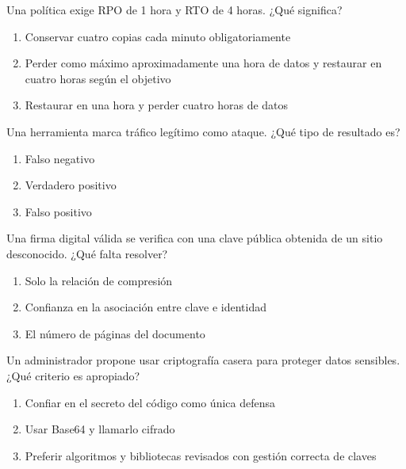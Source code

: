 \noindent\begin{minipage}{\linewidth}\setlength{\parskip}{4pt}\label{q:R-096}
Una política exige RPO de 1 hora y RTO de 4 horas. ¿Qué significa?
\begin{enumerate}[label=\Alph*),nosep]
\item Conservar cuatro copias cada minuto obligatoriamente
\item Perder como máximo aproximadamente una hora de datos y restaurar en cuatro horas según el objetivo
\item Restaurar en una hora y perder cuatro horas de datos
\end{enumerate}\end{minipage}\par\medskip

\noindent\begin{minipage}{\linewidth}\setlength{\parskip}{4pt}\label{q:R-097}
Una herramienta marca tráfico legítimo como ataque. ¿Qué tipo de resultado es?
\begin{enumerate}[label=\Alph*),nosep]
\item Falso negativo
\item Verdadero positivo
\item Falso positivo
\end{enumerate}\end{minipage}\par\medskip

\noindent\begin{minipage}{\linewidth}\setlength{\parskip}{4pt}\label{q:R-098}
Una firma digital válida se verifica con una clave pública obtenida de un sitio desconocido. ¿Qué falta resolver?
\begin{enumerate}[label=\Alph*),nosep]
\item Solo la relación de compresión
\item Confianza en la asociación entre clave e identidad
\item El número de páginas del documento
\end{enumerate}\end{minipage}\par\medskip

\noindent\begin{minipage}{\linewidth}\setlength{\parskip}{4pt}\label{q:R-099}
Un administrador propone usar criptografía casera para proteger datos sensibles. ¿Qué criterio es apropiado?
\begin{enumerate}[label=\Alph*),nosep]
\item Confiar en el secreto del código como única defensa
\item Usar Base64 y llamarlo cifrado
\item Preferir algoritmos y bibliotecas revisados con gestión correcta de claves
\end{enumerate}\end{minipage}\par\medskip

